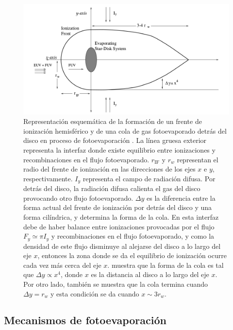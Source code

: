 \begin{figure}
  \centering
  \includegraphics[width=0.8\linewidth]{./Figures/Johnstone-shape}
  \caption{Representación esquemática de la formación de un frente de ionización hemisférico y de una cola de gas fotoevaporado detrás del disco en proceso de fotoevaporación \citep{Johnstone:1998}. La línea gruesa exterior representa la interfaz donde existe equilibrio entre ionizaciones y recombinaciones en el flujo fotoevaporado. $r_{\mathrm{IF}}$ y $r_w$ representan el radio del frente de ionización en las direcciones de los ejes $x$ e $y$, respectivamente. $I_y$ representa el campo de radiación difusa. Por detrás del disco, la radiación difusa calienta el gas del disco provocando otro flujo fotoevaporado. $\Delta y$ es la diferencia entre la forma actual del frente de ionización por detrás del disco y una forma cilíndrica, y determina la forma de la cola. En esta interfaz debe de haber balance entre ionizaciones provocadas por el flujo $F_y \simeq \pi I_y$ y recombinaciones en el flujo fotoevaporado, y como la densidad de este flujo disminuye al alejarse del disco a lo largo del eje $x$, entonces la zona donde se da el equilibrio de ionización ocurre cada vez más cerca del eje $x$. \citet{Johnstone:1998} muestra que la forma de la cola es tal que $\Delta y \propto x^4$, donde $x$ es la distancia al disco a lo largo del eje $x$. Por otro lado, también se muestra que la cola termina cuando $\Delta y = r_w$ y esta condición se da cuando $x \sim 3 r_w$.} %
    \label{fig:prop-shape}
\end{figure}


\subsection{Mecanismos de fotoevaporación \citep{Johnstone:1998}}
\label{sec:photoevaporation}

